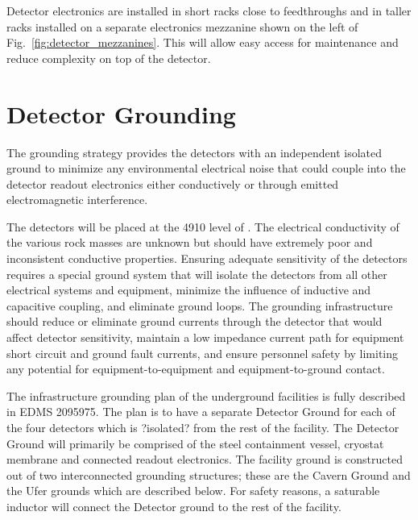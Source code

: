 Detector electronics are installed in short racks close to
feedthroughs and in taller racks installed on a separate electronics
mezzanine shown on the left of Fig.~\ref{fig:detector_mezzanines}.
This will allow easy access for maintenance and reduce complexity on
top of the detector.

\section{Detector Grounding}
\label{sec:fdsp-coord-faci-grounding}


The grounding strategy provides the detectors with an independent
isolated ground to minimize any environmental electrical noise that
could couple into the detector readout electronics either conductively or
through emitted electromagnetic interference.

The detectors will be placed at the 4910 level of \surf. The
electrical conductivity of the various rock masses are unknown but
should have extremely poor and inconsistent conductive
properties. Ensuring adequate sensitivity of the detectors requires a
special ground system that will isolate the detectors from all other
electrical systems and equipment, minimize the influence of inductive
and capacitive coupling, and eliminate ground loops. The grounding
infrastructure should reduce or eliminate ground currents through the
detector that would affect detector sensitivity, maintain a low
impedance current path for equipment short circuit and ground fault
currents, and ensure personnel safety by limiting any potential for
equipment-to-equipment and equipment-to-ground contact.

The infrastructure grounding plan of the underground facilities is fully described in EDMS 2095975.  The plan is to have a separate Detector Ground for each of the four detectors which is ?isolated? from the rest of the facility.  The Detector Ground will primarily be comprised of the steel containment vessel, cryostat membrane and connected readout electronics.  The facility ground is constructed out of two interconnected grounding structures; these are the Cavern Ground and the Ufer grounds which are described below.  For safety reasons, a saturable inductor will connect the Detector ground to the rest of the facility. 

